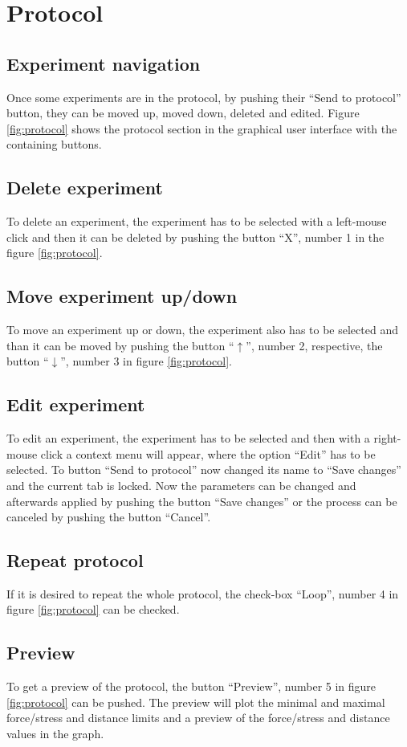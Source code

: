 \chapter{Protocol}

\section{Experiment navigation}
Once some experiments are in the protocol, by pushing their ``Send to protocol'' button, they can be moved up, moved down, deleted and edited. Figure \ref{fig:protocol} shows the protocol section in the graphical user interface with the containing buttons.

\section{Delete experiment}
To delete an experiment, the experiment has to be selected with a left-mouse click and then it can be deleted by pushing the button ``X'', number 1 in the figure \ref{fig:protocol}.

\section{Move experiment up/down}
To move an experiment up or down, the experiment also has to be selected and than it can be moved by pushing the button ``\(\uparrow\)'', number 2, respective, the button ``\(\downarrow\)'', number 3 in figure \ref{fig:protocol}.

\section{Edit experiment}
To edit an experiment, the experiment has to be selected and then with a right-mouse click a context menu will appear, where the option ``Edit'' has to be selected. To button ``Send to protocol'' now changed its name to ``Save changes'' and the current tab is locked. Now the parameters can be changed and afterwards applied by pushing the button ``Save changes'' or the process can be canceled by pushing the button ``Cancel''.

\section{Repeat protocol}
If it is desired to repeat the whole protocol, the check-box ``Loop'', number 4 in figure \ref{fig:protocol} can be checked.

\section{Preview}
To get a preview of the protocol, the button ``Preview'', number 5 in figure \ref{fig:protocol} can be pushed. The preview will plot the minimal and maximal force/stress and distance limits and a preview of the force/stress and distance values in the graph.


